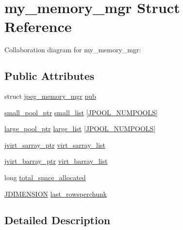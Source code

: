 \hypertarget{structmy__memory__mgr}{}\section{my\+\_\+memory\+\_\+mgr Struct Reference}
\label{structmy__memory__mgr}


Collaboration diagram for my\+\_\+memory\+\_\+mgr\+:
\subsection*{Public Attributes}
\begin{DoxyCompactItemize}
\item 
struct \mbox{\hyperlink{structjpeg__memory__mgr}{jpeg\+\_\+memory\+\_\+mgr}} \mbox{\hyperlink{structmy__memory__mgr_a692dd77bfba8ab81c4f42643254d4528}{pub}}
\item 
\mbox{\hyperlink{jmemmgr_8c_a589d78516510f4b5a5d44e28debeab4d}{small\+\_\+pool\+\_\+ptr}} \mbox{\hyperlink{structmy__memory__mgr_a1c2bfaa346643520a2ff682c38e4ce0d}{small\+\_\+list}} \mbox{[}\mbox{\hyperlink{jpeglib_8h_a21147e3031a409bcc8d1ddfa5b2c53b5}{J\+P\+O\+O\+L\+\_\+\+N\+U\+M\+P\+O\+O\+LS}}\mbox{]}
\item 
\mbox{\hyperlink{jmemmgr_8c_a048418eab2b2022aaa4ec587c48a3089}{large\+\_\+pool\+\_\+ptr}} \mbox{\hyperlink{structmy__memory__mgr_af8257908eac43538230773374417739b}{large\+\_\+list}} \mbox{[}\mbox{\hyperlink{jpeglib_8h_a21147e3031a409bcc8d1ddfa5b2c53b5}{J\+P\+O\+O\+L\+\_\+\+N\+U\+M\+P\+O\+O\+LS}}\mbox{]}
\item 
\mbox{\hyperlink{jpeglib_8h_abc0b975077507c35b5a577e3ce9e4d91}{jvirt\+\_\+sarray\+\_\+ptr}} \mbox{\hyperlink{structmy__memory__mgr_ad613a2a2e52ac069c63fd083c9c91f04}{virt\+\_\+sarray\+\_\+list}}
\item 
\mbox{\hyperlink{jpeglib_8h_a994f4cba141d82ded90af38e51223f0b}{jvirt\+\_\+barray\+\_\+ptr}} \mbox{\hyperlink{structmy__memory__mgr_a09b8c66f15f14f1c3c247d98d6c81bbc}{virt\+\_\+barray\+\_\+list}}
\item 
long \mbox{\hyperlink{structmy__memory__mgr_acfcdee3e2d3e3d168e2a2aebe081535f}{total\+\_\+space\+\_\+allocated}}
\item 
\mbox{\hyperlink{jmorecfg_8h_a04ed4674f6f1d0d50ec241531e38274f}{J\+D\+I\+M\+E\+N\+S\+I\+ON}} \mbox{\hyperlink{structmy__memory__mgr_a7e30eb574b588f102f07d0ddb94d177d}{last\+\_\+rowsperchunk}}
\end{DoxyCompactItemize}


\subsection{Detailed Description}


